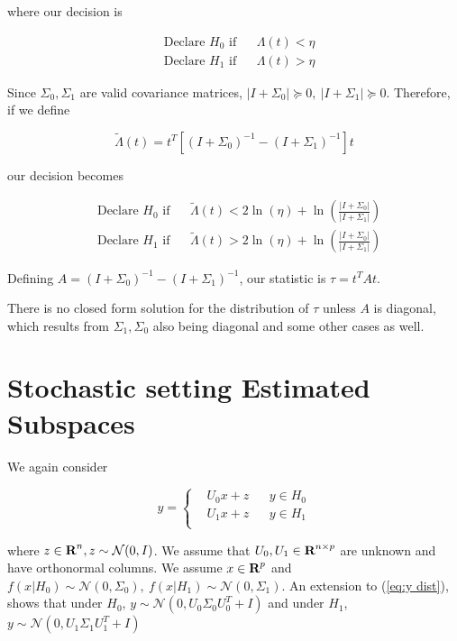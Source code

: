 \documentclass[english]{article}
\begin{document}
where our decision is

\begin{equation}
\begin{aligned}
&\text{Declare } H_0 \text{ if}
&& \Lambda(t) < \eta\\
& \text{Declare } H_1 \text{ if}
&& \Lambda(t) > \eta
\end{aligned}
\end{equation}

Since $\Sigma_0,\Sigma_1$ are valid covariance matrices, $|I+\Sigma_0|\succeq0,~|I+\Sigma_1|\succeq0$. Therefore, if we define

\begin{equation}
\tilde{\Lambda}(t) = t^T\left[\left(I+\Sigma_0\right)^{-1}-\left(I+\Sigma_1\right)^{-1}\right]t
\end{equation}

our decision becomes

\begin{equation}
\begin{aligned}
&\text{Declare } H_0 \text{ if}
&& \tilde{\Lambda}(t) < 2\ln(\eta)+\ln\left(\frac{|I+\Sigma_0|}{|I+\Sigma_1|}\right)\\
& \text{Declare } H_1 \text{ if}
&& \tilde{\Lambda}(t) > 2\ln(\eta)+\ln\left(\frac{|I+\Sigma_0|}{|I+\Sigma_1|}\right)
\end{aligned}
\end{equation}

Defining $A=\left(I+\Sigma_0\right)^{-1}-\left(I+\Sigma_1\right)^{-1}$, our statistic is $\tau=t^TAt$.

There is no closed form solution for the distribution of $\tau$ unless $A$ is diagonal, which results from $\Sigma_1,\Sigma_0$ also being diagonal and some other cases as well.

\section*{Stochastic setting Estimated Subspaces}

We again consider

\begin{equation}
y=\left\{
\begin{aligned}
&U_0x+z
&& y\in H_0\\
&U_1x+z
&& y\in H_1\\
\end{aligned}\right.
\end{equation}

where $z\in{\mbox{\bf R}}^n, z\sim\mathcal{N}(0,I)$. We assume that $U_0,U_1\in{\mbox{\bf R}}^{n\times p}$ are unknown and have orthonormal columns. We assume $x\in{\mbox{\bf R}}^p$ and $f(x|H_0)\sim\mathcal{N}(0,\Sigma_0),~f(x|H_1)\sim\mathcal{N}(0,\Sigma_1)$. An extension to (\ref{eq:y dist}), shows that under $H_0$, $y\sim\mathcal{N}(0, U_0\Sigma_0U_0^T + I)$ and under $H_1$, $y\sim\mathcal{N}(0, U_1\Sigma_1U_1^T + I)$
\end{document}
